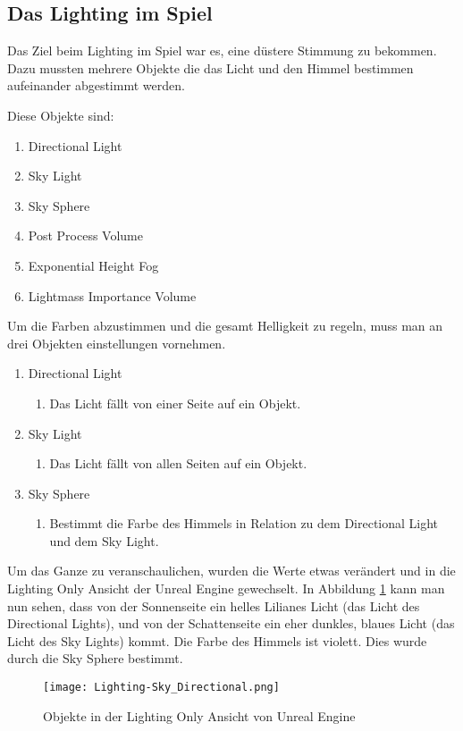\subsection{Das Lighting im Spiel}
Das Ziel beim Lighting im Spiel war es, eine düstere Stimmung zu bekommen. Dazu mussten mehrere Objekte die das Licht und den Himmel bestimmen aufeinander abgestimmt werden.

Diese Objekte sind:
\begin{enumerate}
    \item Directional Light
    \item Sky Light
    \item Sky Sphere
    \item Post Process Volume
    \item Exponential Height Fog
    \item Lightmass Importance Volume
\end{enumerate}

Um die Farben abzustimmen und die gesamt Helligkeit zu regeln, muss man an drei Objekten einstellungen vornehmen.
\begin{enumerate}
    \item Directional Light
    \begin{enumerate}
        \item Das Licht fällt von einer Seite auf ein Objekt.
    \end{enumerate}
    \item Sky Light
    \begin{enumerate}
        \item Das Licht fällt von allen Seiten auf ein Objekt.
    \end{enumerate}
    \item Sky Sphere
    \begin{enumerate}
        \item Bestimmt die Farbe des Himmels in Relation zu dem Directional Light und dem Sky Light.
    \end{enumerate}
\end{enumerate}

Um das Ganze zu veranschaulichen, wurden die Werte etwas verändert und in die Lighting Only Ansicht der Unreal Engine gewechselt.
In Abbildung \ref{lighting:Lighting-Sky_Directional} kann man nun sehen,
dass von der Sonnenseite ein helles Lilianes Licht (das Licht des Directional Lights), und von der Schattenseite ein eher dunkles, blaues Licht
(das Licht des Sky Lights) kommt.
Die Farbe des Himmels ist violett. Dies wurde durch die Sky Sphere bestimmt.
\begin{figure}[h]
    \centering
    \texttt{[image: Lighting-Sky\_Directional.png]}
    \caption{Objekte in der Lighting Only Ansicht von Unreal Engine}
    \label{lighting:Lighting-Sky_Directional}
\end{figure}

